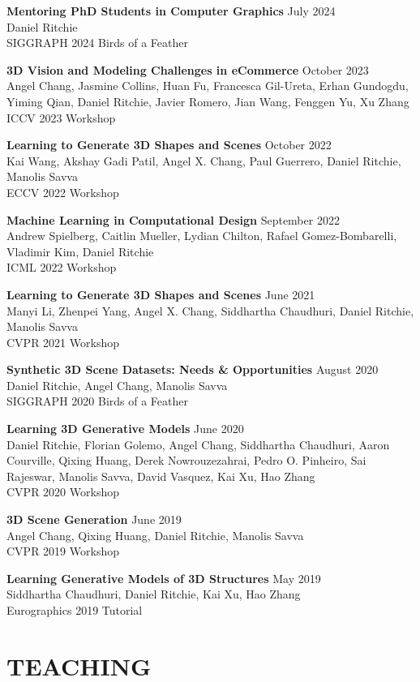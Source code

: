 \documentclass[line,margin]{res}
\begin{document}
\begin{resume}
\newcommand{\tutorial}[4] {
	\textbf{#1} \hfill #4\\
	#2\\
	#3
}
\newcommand{\workshop}[4] {
	\textbf{#1} \hfill #4\\
	#2\\
	#3
}

\workshop
{Mentoring PhD Students in Computer Graphics}
{Daniel Ritchie}
{SIGGRAPH 2024 Birds of a Feather}
{July 2024}

\workshop
{3D Vision and Modeling Challenges in eCommerce}
{Angel Chang, Jasmine Collins, Huan Fu, Francesca Gil-Ureta, Erhan Gundogdu, Yiming Qian, Daniel Ritchie, Javier Romero, Jian Wang, Fenggen Yu, Xu Zhang}
{ICCV 2023 Workshop}
{October 2023}

\workshop
{Learning to Generate 3D Shapes and Scenes}
{Kai Wang, Akshay Gadi Patil, Angel X. Chang, Paul Guerrero, Daniel Ritchie, Manolis Savva}
{ECCV 2022 Workshop}
{October 2022}

\workshop
{Machine Learning in Computational Design}
{Andrew Spielberg, Caitlin Mueller, Lydian Chilton, Rafael Gomez-Bombarelli, Vladimir Kim, Daniel Ritchie}
{ICML 2022 Workshop}
{September 2022}

\workshop
{Learning to Generate 3D Shapes and Scenes}
{Manyi Li, Zhenpei Yang, Angel X. Chang, Siddhartha Chaudhuri, Daniel Ritchie, Manolis Savva}
{CVPR 2021 Workshop}
{June 2021}

\workshop
{Synthetic 3D Scene Datasets: Needs \& Opportunities}
{Daniel Ritchie, Angel Chang, Manolis Savva}
{SIGGRAPH 2020 Birds of a Feather}
{August 2020}

\workshop
{Learning 3D Generative Models}
{Daniel Ritchie, Florian Golemo, Angel Chang, Siddhartha Chaudhuri, Aaron Courville, Qixing Huang, Derek Nowrouzezahrai, Pedro O. Pinheiro, Sai Rajeswar, Manolis Savva, David Vasquez, Kai Xu, Hao Zhang}
{CVPR 2020 Workshop}
{June 2020}

\workshop
{3D Scene Generation}
{Angel Chang, Qixing Huang, Daniel Ritchie, Manolis Savva}
{CVPR 2019 Workshop}
{June 2019}

\tutorial
{Learning Generative Models of 3D Structures}
{Siddhartha Chaudhuri, Daniel Ritchie, Kai Xu, Hao Zhang}
{Eurographics 2019 Tutorial}
{May 2019}


\section{TEACHING}


\end{resume}
\end{document}
